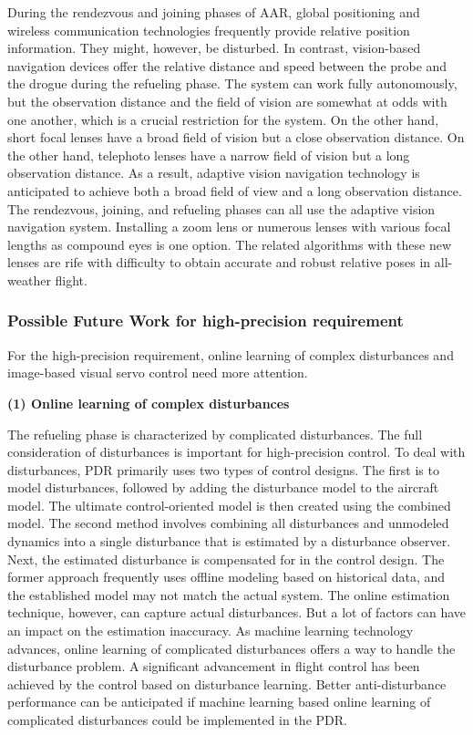 During the rendezvous and joining phases of AAR, global positioning
and wireless communication technologies frequently provide relative
position information. They might, however, be disturbed. In contrast,
vision-based navigation devices offer the relative distance and speed
between the probe and the drogue during the refueling phase. The system
can work fully autonomously, but the observation distance and the
field of vision are somewhat at odds with one another, which is a
crucial restriction for the system. On the other hand, short focal
lenses have a broad field of vision but a close observation distance.
On the other hand, telephoto lenses have a narrow field of vision
but a long observation distance. As a result, adaptive vision navigation
technology is anticipated to achieve both a broad field of view and
a long observation distance. The rendezvous, joining, and refueling
phases can all use the adaptive vision navigation system. Installing
a zoom lens or numerous lenses with various focal lengths as compound
eyes is one option. The related algorithms with these new lenses are
rife with difficulty to obtain accurate and robust relative poses
in all-weather flight. 

\subsubsection{Possible Future Work for high-precision requirement }

For the high-precision requirement, online learning of complex disturbances
and image-based visual servo control need more attention. 

\textbf{(1) Online learning of complex disturbances }

The refueling phase is characterized by complicated disturbances.
The full consideration of disturbances is important for high-precision
control. To deal with disturbances, PDR primarily uses two types of
control designs. The first is to model disturbances, followed by adding
the disturbance model to the aircraft model. The ultimate control-oriented
model is then created using the combined model. The second method
involves combining all disturbances and unmodeled dynamics into a
single disturbance that is estimated by a disturbance observer. Next,
the estimated disturbance is compensated for in the control design.
The former approach frequently uses offline modeling based on historical
data, and the established model may not match the actual system. The
online estimation technique, however, can capture actual disturbances.
But a lot of factors can have an impact on the estimation inaccuracy.
As machine learning technology advances, online learning of complicated
disturbances offers a way to handle the disturbance problem. A significant
advancement in flight control has been achieved by the control based
on disturbance learning\cite{o2022neural}. Better anti-disturbance
performance can be anticipated if machine learning based online learning
of complicated disturbances could be implemented in the PDR. 

